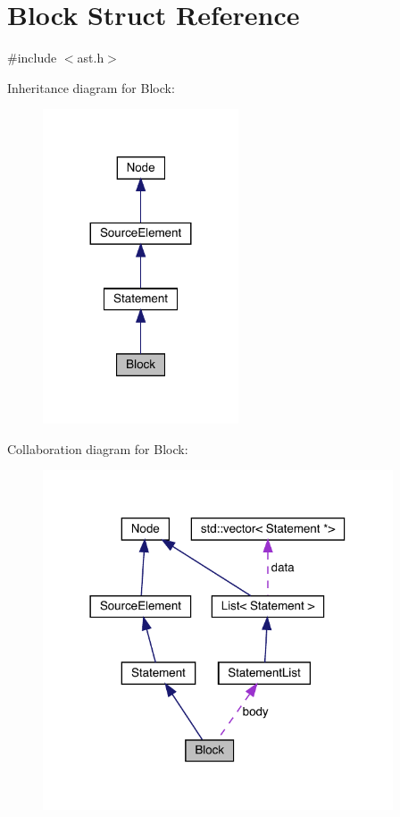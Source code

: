 \hypertarget{struct_block}{}\section{Block Struct Reference}
\label{struct_block}


{\ttfamily \#include $<$ast.\+h$>$}



Inheritance diagram for Block\+:
\nopagebreak
\begin{figure}[H]
\begin{center}
\leavevmode
\includegraphics[width=164pt]{struct_block__inherit__graph}
\end{center}
\end{figure}


Collaboration diagram for Block\+:
\nopagebreak
\begin{figure}[H]
\begin{center}
\leavevmode
\includegraphics[width=294pt]{struct_block__coll__graph}
\end{center}
\end{figure}
